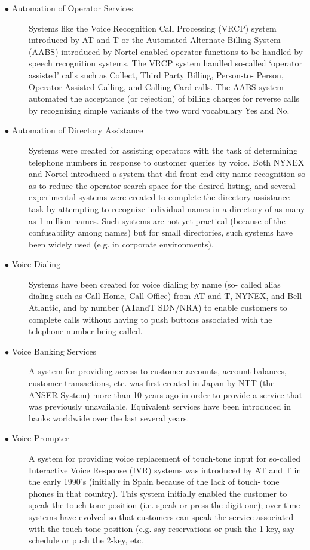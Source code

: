 \documentclass[12pt,a4paper,oneside]{memoir}
\begin{document}
\begin{description}
  \item[$\bullet$ Automation of Operator Services] Systems like the Voice Recognition Call Processing (VRCP) system introduced by AT and T or the Automated Alternate Billing System (AABS) introduced by Nortel enabled operator functions to be handled by speech recognition systems. The VRCP system handled so-called ‘operator assisted’ calls such as Collect, Third Party Billing, Person-to- Person, Operator Assisted Calling, and Calling Card calls. The AABS system automated the acceptance (or rejection) of billing charges for reverse calls by recognizing simple variants of the two word vocabulary Yes and No.
  \item[$\bullet$ Automation of Directory Assistance]  Systems were created for assisting operators with the task of determining telephone numbers in response to customer queries by voice. Both NYNEX and Nortel introduced a system that did front end city name recognition so as to reduce the operator search space for the desired listing, and several experimental systems were created to complete the directory assistance task by attempting to recognize individual names in a directory of as many as 1 million names. Such systems are not yet practical (because of the confusability among names) but for small directories, such systems have been widely used (e.g. in corporate environments).
  \item[$\bullet$ Voice Dialing] Systems have been created for voice dialing by name (so- called alias dialing such as Call Home, Call Office) from AT and T, NYNEX, and Bell Atlantic, and by number (ATandT SDN/NRA) to enable customers to complete calls without having to push buttons associated with the telephone number being called.
  \item[$\bullet$ Voice Banking Services] A system for providing access to customer accounts, account balances, customer transactions, etc. was first created in Japan by NTT (the ANSER System) more than 10 years ago in order to provide a service that was previously unavailable. Equivalent services have been introduced in banks worldwide over the last several years. 
  \item[$\bullet$ Voice Prompter]A system for providing voice replacement of touch-tone input for so-called Interactive Voice Response (IVR) systems was introduced by AT and T in the early 1990’s (initially in Spain because of the lack of touch- tone phones in that country). This system initially enabled the customer to speak the touch-tone position (i.e. speak or press the digit one); over time systems have evolved so that customers can speak the service associated with the touch-tone position (e.g. say reservations or push the 1-key, say schedule or push the 2-key, etc. 

\end{description}
\end{document}
